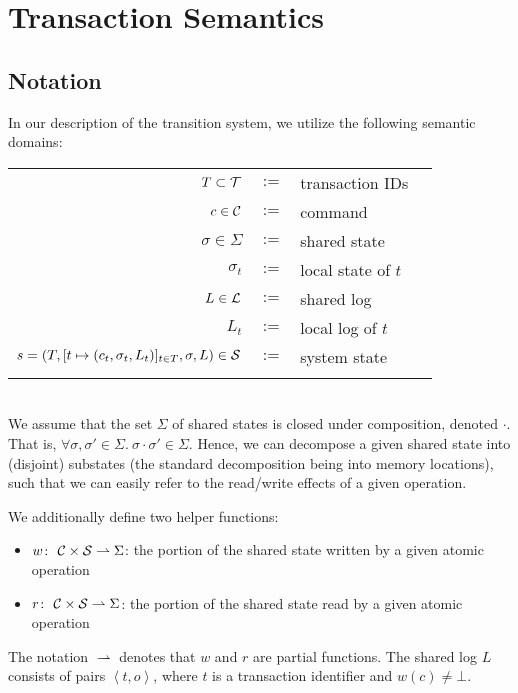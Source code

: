 \section{Transaction Semantics}

\subsection{Notation}

In our description of the transition system, we utilize the following semantic domains:
\\
\begin{tabular}{rcll}
	\\
	$T \subset {\cal T}$ & $:=$ & transaction IDs \\
	$c \in {\cal C}$ & $:=$ & command \\
	$\sigma \in \Sigma$ & $:=$ & shared state \\
	${\sigma_t}$ & $:=$ & local state of $t$ \\
	$L \in {\cal L}$ & $:=$ & shared log \\
	$L_t$ & $:=$ & local log of $t$ \\
	$s = (T, [t \mapsto (c_t,\sigma_t,L_t)]_{t \in T}, \sigma, L) \in {\cal S}$ & $:=$ & system state \\
	\\
\end{tabular}
\\
We assume that the set $\Sigma$ of shared states is closed under composition, denoted $\cdot$. That is,
$\forall \sigma,\sigma' \in \Sigma.\ \sigma \cdot \sigma' \in \Sigma$. Hence, we can decompose a given shared state into (disjoint) substates (the standard decomposition being into memory locations), such that we can easily refer to the read/write effects of a given operation.

We additionally define two helper functions:
\begin{itemize}
\item $w \colon\ {\cal C} \times {\cal S} \rightharpoonup \Sigma$: the portion of the shared state written by a given atomic operation
\item $r \colon\ {\cal C} \times {\cal S} \rightharpoonup \Sigma$: the portion of the shared state read by a given atomic operation
\end{itemize}
The notation $\rightharpoonup$ denotes that $w$ and $r$ are partial functions. The shared log $L$ consists of pairs $\left\langle t,o \right\rangle$, where $t$ is a transaction identifier and $w(c) \neq \bot$.


